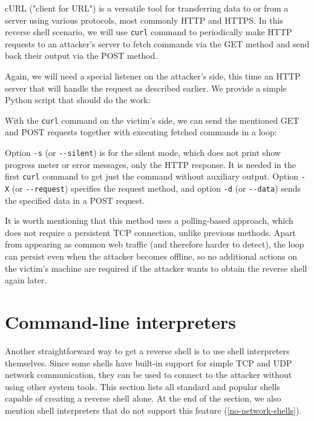 
cURL ("client for URL") is a versatile tool for transferring data to or from a server using various protocols, most commonly HTTP and HTTPS. In this reverse shell scenario, we will use \texttt{curl} command to periodically make HTTP requests to an attacker's server to fetch commands via the GET method and send back their output via the POST method.

Again, we will need a special listener on the attacker's side, this time an HTTP server that will handle the request as described earlier. We provide a simple Python script that should do the work:


With the \texttt{curl} command on the victim's side, we can send the mentioned GET and POST requests together with executing fetched commands in a loop:


Option \texttt{-s} (or \texttt{-{}-silent}) is for the silent mode, which does not print show progress meter or error messages, only the HTTP response. It is needed in the first \texttt{curl} command to get just the command without auxiliary output. Option \texttt{-X} (or \texttt{-{}-request}) specifies the request method, and option \texttt{-d} (or \texttt{-{}-data}) sends the specified data in a POST request. \cite{curl-man}

It is worth mentioning that this method uses a polling-based approach, which does not require a persistent TCP connection, unlike previous methods. Apart from appearing as common web traffic (and therefore harder to detect), the loop can persist even when the attacker becomes offline, so no additional actions on the victim's machine are required if the attacker wants to obtain the reverse shell again later.


\section{Command-line interpreters}

Another straightforward way to get a reverse shell is to use shell interpreters themselves. Since some shells have built-in support for simple TCP and UDP network communication, they can be used to connect to the attacker without using other system tools. This section lists all standard and popular shells capable of creating a reverse shell alone. At the end of the section, we also mention shell interpreters that do not support this feature (\cref{no-network-shells}).

